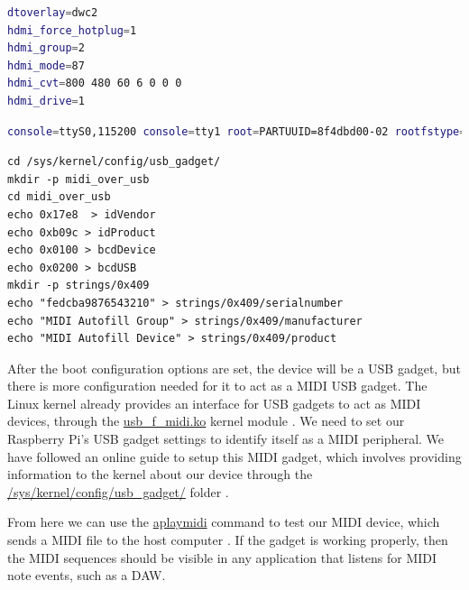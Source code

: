 \begin{minipage}{\linewidth}

  \begin{lstlisting}[language=bash,
  label={lst:bootconfig},
  caption=Lines added to /boot/config.txt \autocite{raspberryPiGadgetSetup, raspberryPiHDMIFix}]
dtoverlay=dwc2
hdmi_force_hotplug=1
hdmi_group=2
hdmi_mode=87
hdmi_cvt=800 480 60 6 0 0 0
hdmi_drive=1
  \end{lstlisting}

  \begin{lstlisting}[language=bash, label={lst:bootcmdline}, caption=DietPi /boot/cmdline.txt modified to allow a USB Gadget \autocite{raspberryPiGadgetSetup}, breaklines=true]
console=ttyS0,115200 console=tty1 root=PARTUUID=8f4dbd00-02 rootfstype=ext4 elevator=deadline fsck.repair=yes rootwait quiet net.ifnames=0 modules-load=dwc2,g_ether
  \end{lstlisting}

  \begin{lstlisting}[label={lst:usb_gadget}, caption=Bash procedure to setup a MIDI Gadget\, modified for our device \autocite{raspberryPiGadgetSetup}, breaklines=true]
cd /sys/kernel/config/usb_gadget/
mkdir -p midi_over_usb
cd midi_over_usb
echo 0x17e8  > idVendor
echo 0xb09c > idProduct
echo 0x0100 > bcdDevice
echo 0x0200 > bcdUSB
mkdir -p strings/0x409
echo "fedcba9876543210" > strings/0x409/serialnumber
echo "MIDI Autofill Group" > strings/0x409/manufacturer
echo "MIDI Autofill Device" > strings/0x409/product
  \end{lstlisting}

\end{minipage}

After the boot configuration options are set, the device will be a USB gadget, but there
is more configuration needed for it to act as a MIDI USB gadget. The Linux kernel already
provides an interface for USB gadgets to act as MIDI devices, through the
\url{usb_f_midi.ko} kernel module \autocite{usbGadgetDocumentation}. We need to set our
Raspberry Pi's USB gadget settings to identify itself as a MIDI peripheral. We have
followed an online guide to setup this MIDI gadget, which involves providing information
to the kernel about our device through the \url{/sys/kernel/config/usb_gadget/} folder
\autocite{raspberryPiGadgetSetup}.

From here we can use the \url{aplaymidi} command to test our MIDI device, which sends a
MIDI file to the host computer \autocite{gadgetTesting}. If the gadget is working
properly, then the MIDI sequences should be visible in any application that listens for
MIDI note events, such as a DAW.

